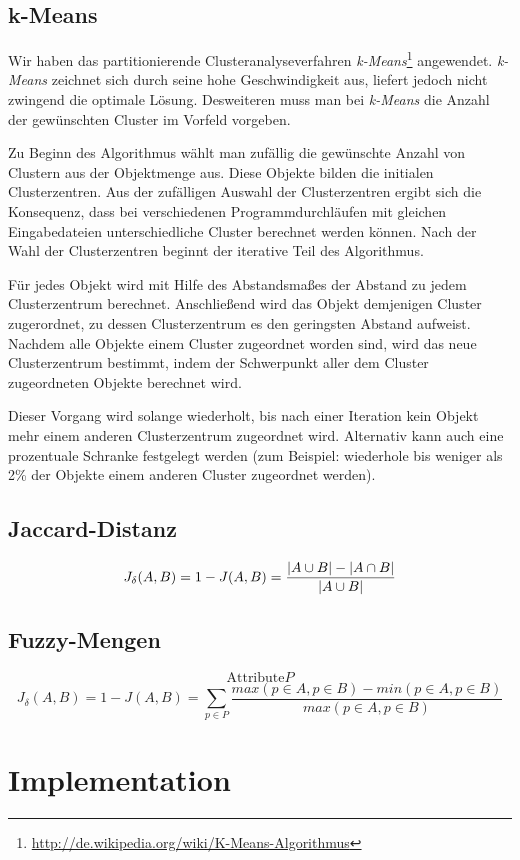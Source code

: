 \documentclass[a4paper]{llncs}
\begin{document}
\subsection{k-Means}
Wir haben das partitionierende Clusteranalyseverfahren \emph{k-Means}\footnote{\url{http://de.wikipedia.org/wiki/K-Means-Algorithmus}} angewendet.
\emph{k-Means} zeichnet sich durch seine hohe Geschwindigkeit aus, liefert jedoch nicht zwingend die optimale Lösung. Desweiteren muss man bei \emph{k-Means} die Anzahl der gewünschten Cluster im Vorfeld vorgeben.

Zu Beginn des Algorithmus wählt man zufällig die gewünschte Anzahl von Clustern aus der Objektmenge aus. Diese Objekte bilden die initialen Clusterzentren. Aus der zufälligen Auswahl der Clusterzentren ergibt sich die Konsequenz, dass bei verschiedenen Programmdurchläufen mit gleichen Eingabedateien unterschiedliche Cluster berechnet werden können. Nach der Wahl der Clusterzentren beginnt der iterative Teil des Algorithmus.

Für jedes Objekt wird mit Hilfe des Abstandsmaßes der Abstand zu jedem Clusterzentrum berechnet. Anschließend wird das Objekt demjenigen Cluster zugerordnet, zu dessen Clusterzentrum es den geringsten Abstand aufweist.
Nachdem alle Objekte einem Cluster zugeordnet worden sind, wird das neue Clusterzentrum bestimmt, indem der Schwerpunkt aller dem Cluster zugeordneten Objekte berechnet wird.

Dieser Vorgang wird solange wiederholt, bis nach einer Iteration kein Objekt mehr einem anderen Clusterzentrum zugeordnet wird. Alternativ kann auch eine prozentuale Schranke festgelegt werden (zum Beispiel: wiederhole bis weniger als 2\% der Objekte einem anderen Cluster zugeordnet werden).

\subsection{Jaccard-Distanz}

$$J_{\delta}(A,B) = 1 - J(A,B) = { { |A \cup B| - |A \cap B| } \over |A \cup B| }$$

\subsection{Fuzzy-Mengen}
$$\mbox{Attribute}  P$$
$$J_{\delta}(A,B) = 1 - J(A,B) = \sum_{p \in P}\frac{max(p \in A,p \in B) - min(p \in A,p \in B)}{max(p \in A,p \in B)}$$


\section{Implementation}
\end{document}
